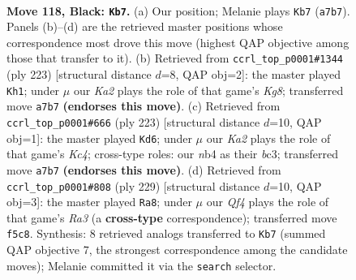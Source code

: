 \documentclass[11pt]{article}
\begin{document}
\clearpage

\begin{figure}[p]\centering
\begin{subfigure}{0.46\textwidth}\centering
\resizebox{\linewidth}{!}{%
\newchessgame
\chessboard[
  setfen={3B4/k7/8/5q2/1N6/1K6/8/8 b - - 5 118},
  showmover=false,
  pgfstyle=straightmove, color=movearrow, markmove={a7-b7}
]}
\caption{}
\end{subfigure}\hfill
\begin{subfigure}{0.46\textwidth}\centering
\resizebox{\linewidth}{!}{%
\newchessgame
\chessboard[
  setfen={8/8/8/8/8/6KN/4B3/6k1 b - - 51 112},
  showmover=false,
  pgfstyle=straightmove, color=movearrow, markmove={g1-h1}
]}
\caption{}
\end{subfigure}
\\[4pt]
\begin{subfigure}{0.46\textwidth}\centering
\resizebox{\linewidth}{!}{%
\newchessgame
\chessboard[
  setfen={8/8/8/2k5/8/2B5/4B1K1/8 b - - 2 112},
  showmover=false,
  pgfstyle=straightmove, color=movearrow, markmove={c5-d6}
]}
\caption{}
\end{subfigure}\hfill
\begin{subfigure}{0.46\textwidth}\centering
\resizebox{\linewidth}{!}{%
\newchessgame
\chessboard[
  setfen={8/8/r7/2NK1B2/8/5n2/1k6/8 b - - 69 115},
  showmover=false,
  pgfstyle=straightmove, color=movearrow, markmove={a6-a8}
]}
\caption{}
\end{subfigure}
\caption{\textbf{Move 118, Black: \texttt{Kb7}.} (a) Our position; Melanie plays \texttt{Kb7} (\texttt{a7b7}). Panels (b)--(d) are the retrieved master positions whose correspondence most drove this move (highest QAP objective among those that transfer to it). (b) Retrieved from \texttt{ccrl\_top\_p0001\#1344} (ply 223) [structural distance $d$=8, QAP obj=2]: the master played \texttt{Kh1}; under $\mu$ our \emph{Ka2} plays the role of that game's \emph{Kg8}; transferred move \texttt{a7b7} \textbf{(endorses this move)}. (c) Retrieved from \texttt{ccrl\_top\_p0001\#666} (ply 223) [structural distance $d$=10, QAP obj=1]: the master played \texttt{Kd6}; under $\mu$ our \emph{Ka2} plays the role of that game's \emph{Kc4}; cross-type roles: our \emph{n}b4 as their \emph{b}c3; transferred move \texttt{a7b7} \textbf{(endorses this move)}. (d) Retrieved from \texttt{ccrl\_top\_p0001\#808} (ply 229) [structural distance $d$=10, QAP obj=3]: the master played \texttt{Ra8}; under $\mu$ our \emph{Qf4} plays the role of that game's \emph{Ra3} (a \textbf{cross-type} correspondence); transferred move \texttt{f5c8}. Synthesis: 8 retrieved analogs transferred to \texttt{Kb7} (summed QAP objective 7, the strongest correspondence among the candidate moves); Melanie committed it via the \texttt{search} selector.}
\label{fig:thought-m235}
\end{figure}
\end{document}

